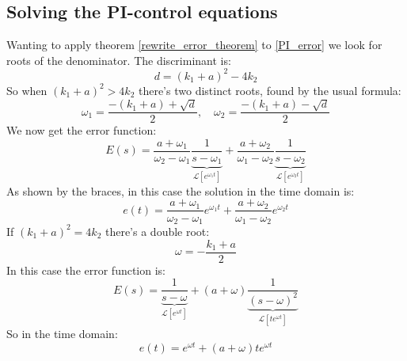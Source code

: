 \documentclass[12pt, a4paper]{article}
\numberwithin{equation}{section}
\begin{document}
\subsection{Solving the PI-control equations}
Wanting to apply theorem \ref{rewrite_error_theorem} to \ref{PI_error} we look for roots of the denominator. The discriminant is:
\begin{equation}
d=(k_1+a)^2-4k_2
\end{equation}
So when $(k_1+a)^2>4k_2$ there's two distinct roots, found by the usual formula:
\begin{equation}
\omega_1=\frac{-(k_1+a)+\sqrt{d}}{2},\quad\omega_2=\frac{-(k_1+a)-\sqrt{d}}{2}
\end{equation}
We now get the error function:
\begin{equation}
E(s)=\frac{a+\omega_1}{\omega_2-\omega_1}\underbrace{\frac{1}{s-\omega_1}}_{\mathcal{L}[e^{\omega_1t}]}+\frac{a+\omega_2}{\omega_1-\omega_2}\underbrace{\frac{1}{s-\omega_2}}_{\mathcal{L}[e^{\omega_2t}]}
\end{equation}
As shown by the braces, in this case the solution in the time domain is:
\begin{equation}
e(t)=\frac{a+\omega_1}{\omega_2-\omega_1}e^{\omega_1t}+\frac{a+\omega_2}{\omega_1-\omega_2}e^{\omega_2t}
\end{equation}
If $(k_1+a)^2=4k_2$ there's a double root:
\begin{equation}
\omega=-\frac{k_1+a}{2}
\end{equation}
In this case the error function is:
\begin{equation}
E(s)=\underbrace{\frac{1}{s-\omega}}_{\mathcal{L}[e^{\omega t}]}+(a+\omega)\underbrace{\frac{1}{(s-\omega)^2}}_{\mathcal{L}[te^{\omega t}]}
\end{equation}
So in the time domain:
\begin{equation}
e(t)=e^{\omega t}+(a+\omega)te^{\omega t}
\end{equation}
\end{document}
